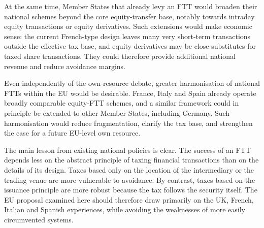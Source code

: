 \documentclass[../../main]{subfiles}
\begin{document}
At the same time, Member States that already levy an FTT would %
broaden their national schemes beyond the core equity-transfer base, notably towards intraday equity transactions or equity derivatives. Such extensions would make economic sense: the current French-type design leaves many very short-term transactions outside the effective tax base, and equity derivatives may be close substitutes for taxed share transactions. They could therefore provide additional national revenue and reduce avoidance margins. %

Even independently of the own-resource debate, greater harmonisation of national FTTs within the EU would be desirable. France, Italy and Spain already operate broadly comparable equity-FTT schemes, and a similar framework could in principle be extended to other Member States, including Germany. Such harmonisation would reduce fragmentation, clarify the tax base, and strengthen the case for a future EU-level own resource.

The main lesson from existing national policies is clear. The success of an FTT depends less on the abstract principle of taxing financial transactions than on the details of its design. Taxes based only on the location of the intermediary or the trading venue are more vulnerable to avoidance. By contrast, taxes based on the issuance principle are more robust because the tax follows the security itself. The EU proposal examined here should therefore draw primarily on the UK, French, Italian and Spanish experiences, while avoiding the weaknesses of more easily circumvented systems.



\newpage
\end{document}
